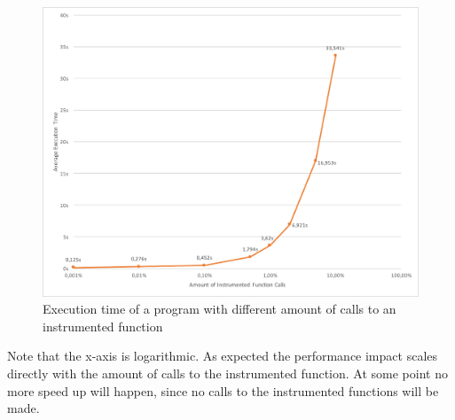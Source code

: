 \begin{figure}
  \includegraphics[width=\textwidth]{gfx/instrumentation_amount_benchmark}
  \caption{Execution time of a program with different amount of calls to an instrumented function}
\label{fig:chap_eval:instrument_benchmark_amount_results}
\end{figure}

Note that the x-axis is logarithmic.
As expected the performance impact scales directly with the amount of calls to the instrumented function.
At some point no more speed up will happen, since no calls to the instrumented functions will be made.

